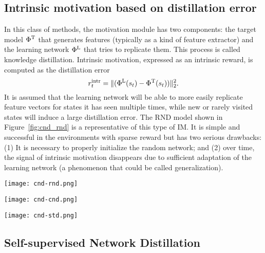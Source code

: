 \documentclass[a4paper,11pt]{elsarticle}
\begin{document}
\subsection{Intrinsic motivation based on distillation error}

In this class of methods, the motivation module has two components: the target model $\Phi^{\rm T}$ that generates features (typically as a kind of feature extractor) and the learning network $\Phi^{\rm L}$ that tries to replicate them. This process is called knowledge distillation. Intrinsic motivation, expressed as an intrinsic reward, is computed as the distillation error
\begin{equation}
\label{eq:distill_error}
r_{t}^{\rm intr} = \| (\Phi^{\rm L}(s_t) - \Phi^{\rm T}(s_t)) \|_2^2.
\end{equation}
It is assumed that the learning network will be able to more easily replicate feature vectors for states it has seen multiple times, while new or rarely visited states will induce a large distillation error.
The RND \citep{burda2018exploration} model shown in Figure~\ref{fig:cnd_rnd} is a representative of this type of IM.
It is simple and successful in the environments with sparse reward but has two serious drawbacks: (1) It is necessary to properly initialize the random network; and (2) over time, the signal of intrinsic motivation disappears due to sufficient adaptation of the learning network (a phenomenon that could be called generalization).

\begin{figure*}[thb]
  \centering
  \texttt{[image: cnd-rnd.png]}
  \caption{The basic principle of generating an exploration signal in random network distillation.}
\label{fig:cnd_rnd}
\end{figure*}

\begin{figure*}[ht]
\centering
  \texttt{[image: cnd-cnd.png]}
  \caption{The basic principle of generating an exploration signal in the regularized target model followed by RND.}
  \label{fig:cnd_cnd}
\end{figure*}

\begin{figure*}[thb]
\centering
\texttt{[image: cnd-std.png]}
\caption{Training of the SND target model using two consecutive states and the self-supervised learning algorithm.}
\label{fig:std_dim_idea}
\end{figure*}


\subsection{Self-supervised Network Distillation}
\end{document}
